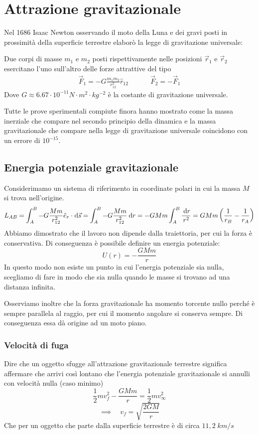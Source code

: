 \documentclass{article}
\theoremstyle{plain}
\begin{document}
\section{Attrazione gravitazionale}
Nel 1686 Isaac Newton osservando il moto della Luna e dei gravi posti in prossimità della superficie terrestre elaborò la legge di gravitazione universale:
\begin{shaded}
    \begin{law}
    Due corpi di masse $m_1$ e $m_2$ posti rispettivamente nelle posizioni $\vec r_1$ e $\vec r_2$ esercitano l'uno sull'altro delle forze attrattive del tipo
    \begin{eqnarray*}\vec F_{1} = - G\frac{m_1m_2}{r_{12}^2}\hat r_{12}&~~~~~~~&\vec F_2=-\vec F_1\end{eqnarray*}
    Dove $G\approx 6.67\cdot 10^{-11}N\cdot m^2\cdot kg^{-2}$ è la costante di gravitazione universale.
\end{law}
\end{shaded}
Tutte le prove sperimentali compiute finora hanno mostrato come la massa inerziale che compare nel secondo principio della dinamica e la massa gravitazionale che compare nella legge di gravitazione universale coincidono con un errore di $10^{-15}$.
\subsection{Energia potenziale gravitazionale}
Considerimamo un sistema di riferimento in coordinate polari in cui la massa $M$ si trova nell'origine. 
\[L_{AB} =\int_A^B - G\frac{Mm}{r_{12}^2}\hat e_r\cdot \!\:\text{d} \vec s =  \int_A^B - G\frac{Mm}{r_{12}^2}\:\text{d} r = - GMm\int_A^B\frac{\:\text{d} r}{r^2} = GMm\left( \frac{1}{r_B} -\frac{1}{r_A} \right)\]
Abbiamo dimostrato che il lavoro non dipende dalla traiettoria, per cui la forza è conservativa. Di conseguenza è possibile definire un energia potenziale:
\[U(r) = - \frac{GMm}{r}\]
In questo modo non esiste un punto in cui l'energia potenziale sia nulla, scegliamo di fare in modo che sia nulla quando le masse si trovano ad una distanza infinita. 

Osserviamo inoltre che la forza gravitazionale ha momento torcente nullo perché è sempre parallela al raggio, per cui il momento angolare si conserva sempre. Di conseguenza essa dà origine ad un moto piano.
\subsubsection{Velocità di fuga}
Dire che un oggetto sfugge all'attrazione gravitazionale terrestre significa affermare che arrivi così lontano che l'energia potenziale gravitazionale si annulli con velocità nulla (caso minimo)
\[\frac{1}{2} mv^2_f -\frac{GMm}{r} = \frac{1}{2}mv^2_{\infty}\]
\[\implies\quad v_f =\sqrt{\frac{2GM}{r} }\]
Che per un oggetto che parte dalla superficie terrestre è di circa $11,2 \;km/s$

\end{document}
